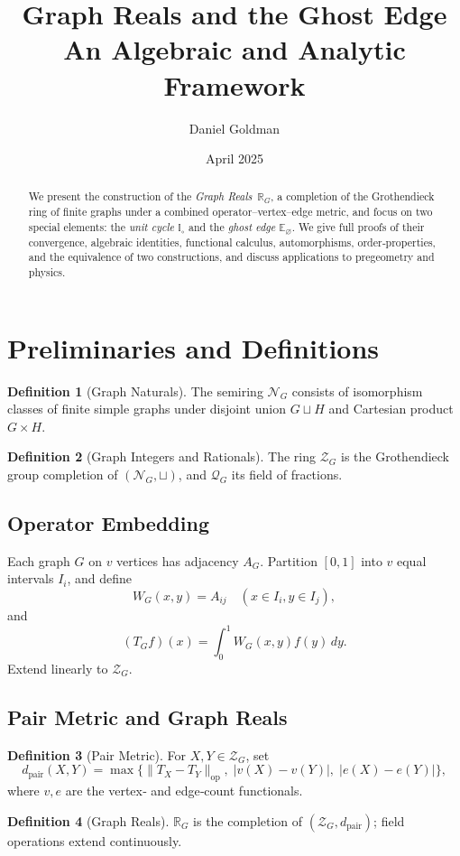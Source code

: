 \documentclass[11pt]{article}
\title{Graph Reals and the Ghost Edge\\An Algebraic and Analytic Framework}
\author{Daniel Goldman}
\date{April 2025}
\theoremstyle{definition}
\newtheorem{definition}{Definition}[section]
\theoremstyle{plain}
\theoremstyle{remark}
\begin{document}
\maketitle

\begin{abstract}
We present the construction of the \emph{Graph Reals}~$\mathbb R_G$, a completion of the Grothendieck ring of finite graphs under a combined operator--vertex--edge metric, and focus on two special elements: the \emph{unit cycle} $\mathbb I_\circ$ and the \emph{ghost edge} $\mathbb E_\varnothing$.  We give full proofs of their convergence, algebraic identities, functional calculus, automorphisms, order‐properties, and the equivalence of two constructions, and discuss applications to pregeometry and physics.
\end{abstract}

\section{Preliminaries and Definitions}

\begin{definition}[Graph Naturals]
The semiring $\mathcal N_G$ consists of isomorphism classes of finite simple graphs under disjoint union $G\sqcup H$ and Cartesian product $G\times H$.
\end{definition}

\begin{definition}[Graph Integers and Rationals]
The ring $\mathcal Z_G$ is the Grothendieck group completion of $(\mathcal N_G,\sqcup)$, and $\mathcal Q_G$ its field of fractions.
\end{definition}

\subsection{Operator Embedding}
Each graph $G$ on $v$ vertices has adjacency $A_G$.  Partition $[0,1]$ into $v$ equal intervals $I_i$, and define
\[W_G(x,y)=A_{ij}\quad(x\in I_i,y\in I_j),\]
and
\[(T_Gf)(x)=\int_0^1 W_G(x,y)f(y)\,dy.
\]
Extend linearly to $\mathcal Z_G$.

\subsection{Pair Metric and Graph Reals}
\begin{definition}[Pair Metric]
For $X,Y\in\mathcal Z_G$, set
\[d_{\mathrm{pair}}(X,Y)=\max\{\|T_X-T_Y\|_{\mathrm{op}},\;|v(X)-v(Y)|,\;|e(X)-e(Y)|\},\]
where $v,e$ are the vertex‐ and edge‐count functionals.
\end{definition}
\begin{definition}[Graph Reals]
$\mathbb R_G$ is the completion of $(\mathcal Z_G,d_{\mathrm{pair}})$; field operations extend continuously.
\end{definition}
\end{document}
